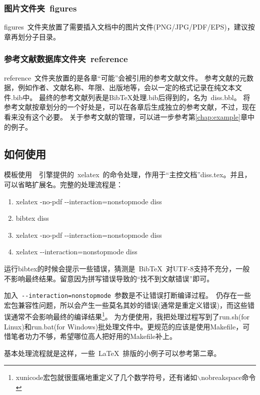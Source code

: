 \subsubsection{图片文件夹~figures}
\label{sec:figuresdir}

figures~文件夹放置了需要插入文档中的图片文件(PNG/JPG/PDF/EPS)，建议按章再划分子目录。

\subsubsection{参考文献数据库文件夹~reference}
\label{sec:bibdir}

reference~文件夹放置的是各章``可能''会被引用的参考文献文件。
参考文献的元数据，例如作者、文献名称、年限、出版地等，会以一定的格式记录在纯文本文件.bib中。
最终的参考文献列表是BibTeX处理.bib后得到的，名为~diss.bbl。
将参考文献按章划分的一个好处是，可以在各章后生成独立的参考文献，不过，现在看来没有这个必要。
关于参考文献的管理，可以进一步参考第\ref{chap:example}章中的例子。

\subsection{如何使用}
\label{sec:process}

模板使用~\XeTeX~引擎提供的~xelatex~的命令处理，作用于“主控文档”diss.tex。并且，可以省略扩展名。完整的处理流程是：
\begin{enumerate}
\item[] xelatex -no-pdf -{}-interaction=nonstopmode diss
\item[] bibtex diss 
\item[] xelatex -no-pdf -{}-interaction=nonstopmode diss 
\item[] xelatex -{}-interaction=nonstopmode diss 
\end{enumerate}

运行bibtex的时候会提示一些错误，猜测是~{{\sc Bib}\TeX}~对UTF-8支持不充分，一般不影响最终结果。留意因为拼写错误导致的``找不到文献错误''即可。

加入~\verb|--interaction=nonstopmode|~参数是不让错误打断编译过程。\XeTeX~仍存在一些宏包兼容性问题，所以会产生一些莫名其妙的错误(通常是重定义错误)，而这些错误通常不会影响最终的编译结果\footnote{xunicode宏包就很蛋痛地重定义了几个数学符号，还有诸如$\backslash$nobreakspace命令}。
为方便使用，我把处理过程写到了run.sh(for Linux)和run.bat(for Windows)批处理文件中。更规范的应该是使用Makefile，可惜笔者功力不够，希望哪位高人把好用的Makefile补上。

基本处理流程就是这样，一些~\LaTeX~排版的小例子可以参考第二章。

